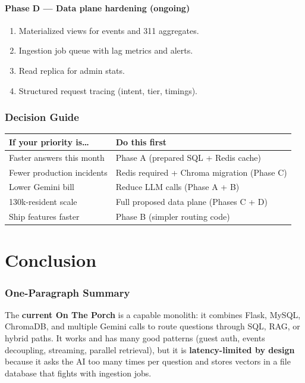 \documentclass[11pt,a4paper]{article}
\begin{document}
\subsection{Phase D --- Data plane hardening (ongoing)}
\begin{enumerate}
  \item Materialized views for events and 311 aggregates.
  \item Ingestion job queue with lag metrics and alerts.
  \item Read replica for admin stats.
  \item Structured request tracing (intent, tier, timings).
\end{enumerate}

\section{Decision Guide}

\begin{table}[h]
\centering
\small
\begin{tabular}{@{}ll@{}}
\toprule
\textbf{If your priority is\ldots} & \textbf{Do this first} \\
\midrule
Faster answers this month & Phase A (prepared SQL + Redis cache) \\
Fewer production incidents & Redis required + Chroma migration (Phase C) \\
Lower Gemini bill & Reduce LLM calls (Phase A + B) \\
130k-resident scale & Full proposed data plane (Phases C + D) \\
Ship features faster & Phase B (simpler routing code) \\
\bottomrule
\end{tabular}
\end{table}

\part{Conclusion}

\section{One-Paragraph Summary}

The \textbf{current On The Porch} is a capable monolith: it combines Flask, MySQL, ChromaDB, and multiple Gemini calls to route questions through SQL, RAG, or hybrid paths. It works and has many good patterns (guest auth, events decoupling, streaming, parallel retrieval), but it is \textbf{latency-limited by design} because it asks the AI too many times per question and stores vectors in a file database that fights with ingestion jobs.
\end{document}
